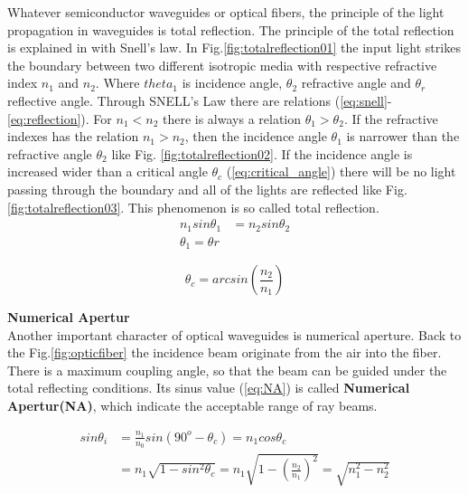 Whatever semiconductor waveguides or optical fibers, the principle of the light propagation in waveguides is total reflection. The principle of the total reflection is explained in \cite{optical_waveguides_fibers} with Snell's law. In Fig.\ref{fig:totalreflection01} the input light strikes the boundary between two different isotropic media with respective refractive index $n_{1}$ and $n_{2}$. Where $theta_{1}$ is incidence angle, $\theta_{2}$ refractive angle and $\theta_{r}$ reflective angle. Through SNELL's Law there are relations (\ref{eq:snell}-\ref{eq:reflection}).  For $n_{1}<n_{2}$ there is  always a relation $\theta_{1}>\theta_{2}$.  If the refractive indexes has the relation $n_{1}>n_{2}$, then the incidence angle $\theta_{1}$ is narrower than the refractive angle $\theta_{2}$ like Fig. \ref{fig:totalreflection02}. If the incidence angle is increased wider than a critical angle $\theta_{c}$ (\ref{eq:critical_angle}) there will be no light passing through the boundary and all of the lights are reflected like Fig. \ref{fig:totalreflection03}. This phenomenon is so called total reflection.
\begin{align}
n_{1}sin\theta_{1}&=n_{2}sin\theta_{2}
\label{eq:snell}\\
\theta_{1}=\theta{r}
\label{eq:reflection}
\end{align}

\begin{equation}
\theta_{c}=arcsin(\frac{n_{2}}{n_{1}})
\label{eq:critical_angle}
\end{equation}


\textbf{ Numerical Apertur }\\

Another important character of optical waveguides is numerical aperture. Back to the Fig.\ref{fig:opticfiber} the incidence beam originate from the air into the fiber. There is a maximum coupling angle, so that the beam can be guided under the total reflecting conditions. Its sinus value (\ref{eq:NA}) is called \textbf{Numerical Apertur(NA)}, which indicate the acceptable range of ray beams.

\begin{align}
sin\theta_{i}&=\frac{n_{1}}{n_{0}}sin(90^{o}-\theta_{c})=n_{1}cos\theta_{c} \nonumber\\
&=n_{1}\sqrt{1-sin^{2}\theta_{c}}=n_{1}\sqrt{1-\left(\frac{n_{2}}{n_{1}}\right)^2}=\sqrt{n^2_{1}-n^2_{2}}
\label{eq:NA}
\end{align}

